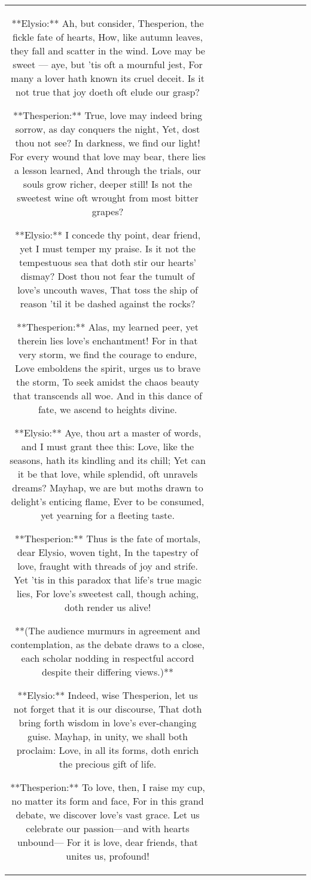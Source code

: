 \begin{table}[h!]
\begin{tabular}{|c|c|c|c|c|c|c|c|c|c|c|}
**Elysio:**  
Ah, but consider, Thesperion, the fickle fate of hearts,  
How, like autumn leaves, they fall and scatter in the wind.  
Love may be sweet — aye, but 'tis oft a mournful jest,  
For many a lover hath known its cruel deceit.  
Is it not true that joy doeth oft elude our grasp?  

**Thesperion:**  
True, love may indeed bring sorrow, as day conquers the night,  
Yet, dost thou not see? In darkness, we find our light!  
For every wound that love may bear, there lies a lesson learned,  
And through the trials, our souls grow richer, deeper still!  
Is not the sweetest wine oft wrought from most bitter grapes?  

**Elysio:**  
I concede thy point, dear friend, yet I must temper my praise.  
Is it not the tempestuous sea that doth stir our hearts’ dismay?  
Dost thou not fear the tumult of love’s uncouth waves,  
That toss the ship of reason 'til it be dashed against the rocks?  

**Thesperion:**  
Alas, my learned peer, yet therein lies love's enchantment!  
For in that very storm, we find the courage to endure,  
Love emboldens the spirit, urges us to brave the storm,  
To seek amidst the chaos beauty that transcends all woe.  
And in this dance of fate, we ascend to heights divine.  

**Elysio:**  
Aye, thou art a master of words, and I must grant thee this:  
Love, like the seasons, hath its kindling and its chill;  
Yet can it be that love, while splendid, oft unravels dreams?  
Mayhap, we are but moths drawn to delight’s enticing flame,  
Ever to be consumed, yet yearning for a fleeting taste.  

**Thesperion:**  
Thus is the fate of mortals, dear Elysio, woven tight,  
In the tapestry of love, fraught with threads of joy and strife.  
Yet ’tis in this paradox that life’s true magic lies,  
For love’s sweetest call, though aching, doth render us alive!  

**(The audience murmurs in agreement and contemplation, as the debate draws to a close, each scholar nodding in respectful accord despite their differing views.)** 

**Elysio:**  
Indeed, wise Thesperion, let us not forget that it is our discourse,  
That doth bring forth wisdom in love’s ever-changing guise.  
Mayhap, in unity, we shall both proclaim:  
Love, in all its forms, doth enrich the precious gift of life.  

**Thesperion:**  
To love, then, I raise my cup, no matter its form and face,  
For in this grand debate, we discover love’s vast grace.  
Let us celebrate our passion—and with hearts unbound—  
For it is love, dear friends, that unites us, profound!  


\end{tabular}
\end{table}
